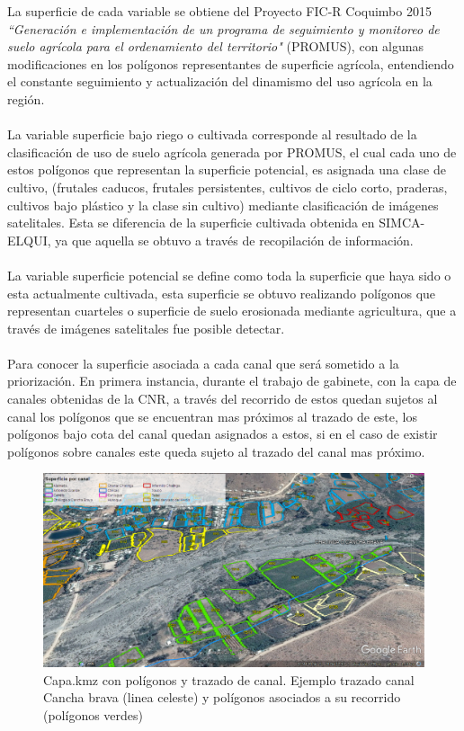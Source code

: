\documentclass[]{article}
\begin{document}
La superficie de cada variable se obtiene del Proyecto FIC-R Coquimbo 2015 \textit{``Generación e implementación de un programa de seguimiento y monitoreo de suelo agrícola para el ordenamiento del territorio"} (PROMUS), con algunas modificaciones en los polígonos representantes de superficie agrícola, entendiendo el constante seguimiento y actualización del dinamismo del uso agrícola en la región.\\
\\
La variable superficie bajo riego o cultivada corresponde al resultado de la clasificación de uso de suelo agrícola generada por PROMUS, el cual cada uno de estos polígonos que representan la superficie potencial, es asignada una clase de cultivo, (frutales caducos, frutales persistentes, cultivos de ciclo corto, praderas, cultivos bajo plástico y la clase sin cultivo) mediante clasificación de imágenes satelitales. Esta se diferencia de la superficie cultivada obtenida en SIMCA-ELQUI, ya que aquella se obtuvo a través de recopilación de información.\\
\\
La variable superficie potencial se define como toda la superficie que haya sido o esta actualmente cultivada, esta superficie se obtuvo realizando polígonos que representan cuarteles o superficie de suelo erosionada mediante agricultura, que a través de imágenes satelitales fue posible detectar.\\
\\
Para conocer la superficie asociada a cada canal que será sometido a la priorización. En primera instancia, durante el trabajo de gabinete, con la capa de canales obtenidas de la CNR, a través del recorrido de estos quedan sujetos al canal los polígonos que se encuentran mas próximos al trazado de este, los polígonos bajo cota del canal quedan asignados a estos, si en el caso de existir polígonos sobre canales este queda sujeto al trazado del canal mas próximo.

\begin{figure}[H]
\centering
\includegraphics[width=\textwidth]{images/capa_kmz_area.eps}
\caption{Capa.kmz con polígonos y trazado de canal. Ejemplo trazado canal Cancha brava (linea celeste) y polígonos asociados a su recorrido (polígonos verdes)}
\label{poligonos}
\end{figure}
\end{document}
